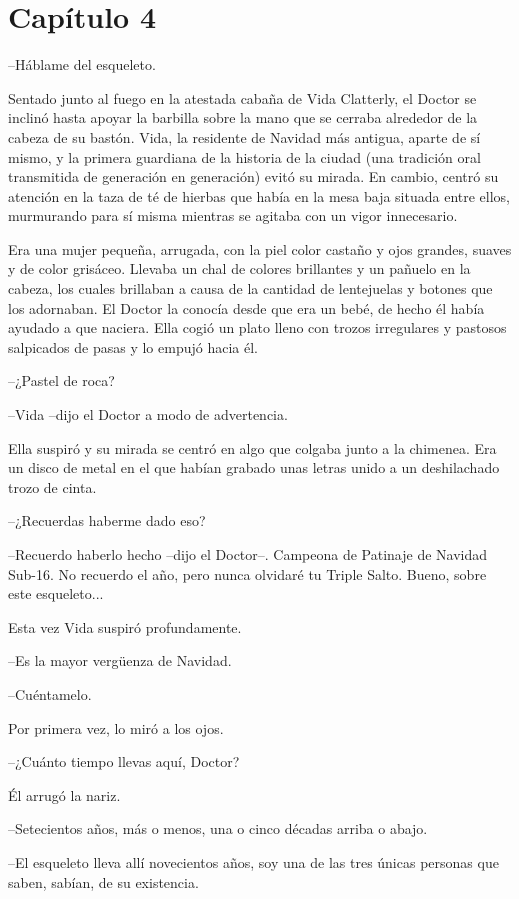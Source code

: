 \chapter*{Capítulo 4}

--Háblame del esqueleto.

Sentado junto al fuego en la atestada cabaña de Vida Clatterly, el Doctor se inclinó hasta apoyar la barbilla sobre la mano que se cerraba alrededor de la cabeza de su bastón. Vida, la residente de Navidad más antigua, aparte de sí mismo, y la primera guardiana de la historia de la ciudad (una tradición oral transmitida de generación en generación) evitó su mirada. En cambio, centró su atención en la taza de té de hierbas que había en la mesa baja situada entre ellos, murmurando para sí misma mientras se agitaba con un vigor innecesario.

Era una mujer pequeña, arrugada, con la piel color castaño y ojos grandes, suaves y de color grisáceo. Llevaba un chal de colores brillantes y un pañuelo en la cabeza, los cuales brillaban a causa de la cantidad de lentejuelas y botones que los adornaban. El Doctor la conocía desde que era un bebé, de hecho él había ayudado a que naciera. Ella cogió un plato lleno con trozos irregulares y pastosos salpicados de pasas y lo empujó hacia él.

--¿Pastel de roca?

--Vida --dijo el Doctor a modo de advertencia.

Ella suspiró y su mirada se centró en algo que colgaba junto a la chimenea. Era un disco de metal en el que habían grabado unas letras unido a un deshilachado trozo de cinta.

--¿Recuerdas haberme dado eso?

--Recuerdo haberlo hecho --dijo el Doctor--. Campeona de Patinaje de Navidad Sub-16. No recuerdo el año, pero nunca olvidaré tu Triple Salto. Bueno, sobre este esqueleto...

Esta vez Vida suspiró profundamente. 

--Es la mayor vergüenza de Navidad.

--Cuéntamelo.

Por primera vez, lo miró a los ojos. 

--¿Cuánto tiempo llevas aquí, Doctor?

Él arrugó la nariz. 

--Setecientos años, más o menos, una o cinco décadas arriba o abajo.

--El esqueleto lleva allí novecientos años, soy una de las tres únicas personas que saben, sabían, de su existencia.

